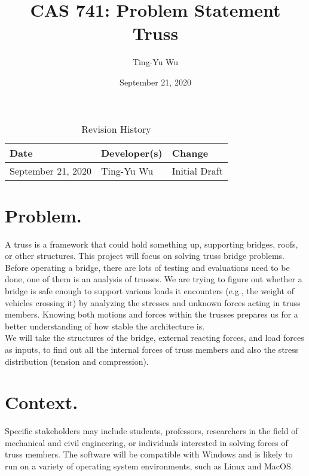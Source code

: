 \documentclass{article}
\title{CAS 741: Problem Statement\\Truss}
\author{Ting-Yu Wu}
\date{September 21, 2020}
\begin{document}
\maketitle

\begin{table}[hp]
\caption{Revision History} \label{TblRevisionHistory}
\begin{tabularx}{\textwidth}{llX}
\toprule
\textbf{Date} & \textbf{Developer(s)} & \textbf{Change}\\
\midrule
September 21, 2020 & Ting-Yu Wu & Initial Draft\\
\bottomrule
\end{tabularx}
\end{table}

\section*{Problem.}
A truss is a framework that could hold something up, supporting bridges, roofs, or other structures. This project will focus on solving truss bridge problems. Before operating a bridge, there are lots of testing and evaluations need to be done, one of them is an analysis of trusses. We are trying to figure out whether a bridge is safe enough to support various loads it encounters (e.g., the weight of vehicles crossing it) by analyzing the stresses and unknown forces acting in truss members. Knowing both motions and forces within the trusses prepares us for a better understanding of how stable the architecture is.\\
We will take the structures of the bridge, external reacting forces, and load forces as inputs, to find out all the internal forces of truss members and also the stress distribution (tension and compression).

\section*{Context.}
Specific stakeholders may include students, professors, researchers in the field of mechanical and civil engineering, or individuals interested in solving forces of truss members. The software will be compatible with Windows and is likely to run on a variety of operating system environments, such as Linux and MacOS. 
\end{document}
